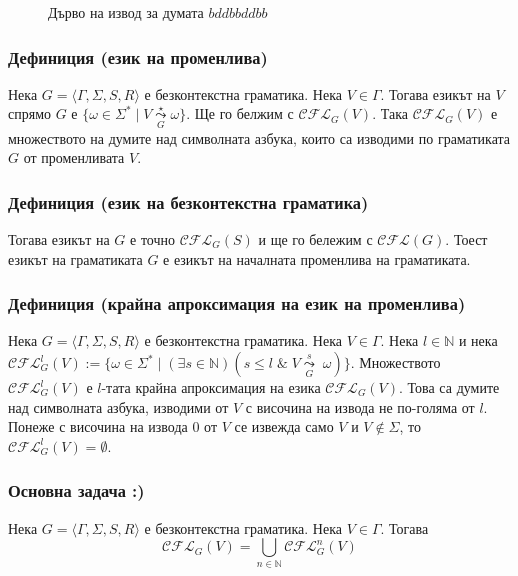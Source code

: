 \documentclass[12pt]{article}
\begin{document}
\begin{figure}[H]
\centering
{}
\caption{Дърво на извод за думата $bddbbddbb$}
\end{figure}

\subsubsection*{Дефиниция (език на променлива)}
Нека \(G = \langle \Gamma,  \Sigma, S, R\rangle\) е безконтекстна граматика.
Нека \(V \in \Gamma\). Тогава езикът на \(V\) спрямо \(G\) е \(\{\omega \in \Sigma^* \mid V \underset{G}{\overset{\star}{\leadsto}} \omega\}\).
Ще го белжим с \(\mathcal{CFL}_G(V)\). Така \(\mathcal{CFL}_G(V)\) е множеството на думите над символната азбука, които са изводими по граматиката \(G\) от променливата \(V\).

\subsubsection*{Дефиниция (език на безконтекстна граматика)}
Тогава езикът на \(G\) е точно \(\mathcal{CFL}_G(S)\) и ще го бележим с \(\mathcal{CFL}(G)\).
Тоест езикът на граматиката \(G\) е езикът на началната променлива на граматиката.

\subsubsection*{Дефиниция (крайна апроксимация на език на променлива)}
Нека \(G = \langle \Gamma,  \Sigma, S, R\rangle\) е безконтекстна граматика.
Нека \(V \in \Gamma\). Нека \(l \in \mathbb{N}\) и нека \(\mathcal{CFL}_G^l(V) := \{\omega \in \Sigma^* \mid (\exists s \in \mathbb{N})(s \leq l \;\&\; V \underset{G}{\overset{s}{\leadsto}} \; \omega)\}\). Множеството \(\mathcal{CFL}_G^l(V)\) е \(l\)-тата крайна апроксимация на езика \(\mathcal{CFL}_G(V)\).
Това са думите над символната азбука, изводими от \(V\) с височина на извода не по-голяма от \(l\).
Понеже с височина на извода \(0\) от \(V\) се извежда само \(V\) и \(V \notin \Sigma\), то \(\mathcal{CFL}_G^l(V) = \emptyset\).

\subsubsection*{Основна задача :)}
Нека \(G = \langle \Gamma,  \Sigma, S, R\rangle\) е безконтекстна граматика.
Нека \(V \in \Gamma\). Тогава
\[\mathcal{CFL}_G(V) = \displaystyle\bigcup_{n \in \mathbb{N}} \mathcal{CFL}_G^n(V)\]
\end{document}
